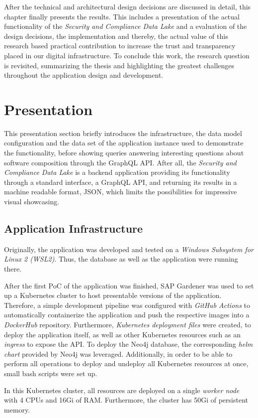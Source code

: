 
After the technical and architectural design decisions are discussed in detail, this chapter finally presents the results. This includes a presentation of the actual functionality of the \emph{Security and Compliance Data Lake} and a evaluation of the design decisions, the implementation and thereby, the actual value of this research based practical contribution to increase the trust and transparency placed in our digital infrastructure. To conclude this work, the research question is revisited, summarizing the thesis and highlighting the greatest challenges throughout the application design and development. 

\section{Presentation} \label{sec:Presentation}
This presentation section briefly introduces the infrastructure, the data model configuration and the data set of the application instance used to demonstrate the functionality, before showing queries answering interesting questions about software composition through the GraphQL API. After all, the \emph{Security and Compliance Data Lake} is a backend application providing its functionality through a standard interface, a GraphQL API, and returning its results in a machine readable format, JSON, which limits the possibilities for impressive visual showcasing.   

\subsection{Application Infrastructure}
Originally, the application was developed and tested on a \emph{Windows Subsystem for Linux 2 (WSL2)}. Thus, the database as well as the application were running there.\par
After the first PoC of the application was finished, SAP Gardener was used to set up a Kubernetes cluster to host presentable versions of the application. Therefore, a simple development pipeline was configured with \emph{GitHub Actions} to automatically containerize the application and push the respective images into a \emph{DockerHub} repository. Furthermore, \emph{Kubernetes deployment files} were created, to deploy the application itself, as well as other Kubernetes resources such as an \emph{ingress} to expose the API. To deploy the Neo4j database, the corresponding \emph{helm chart} provided by Neo4j was leveraged. Additionally, in order to be able to perform all operations to deploy and undeploy all Kubernetes resources at once, small bash scripts were set up.\par
In this Kubernetes cluster, all resources are deployed on a single \emph{worker node} with 4 CPUs and 16Gi of RAM. Furthermore, the cluster has 50Gi of persistent memory.


